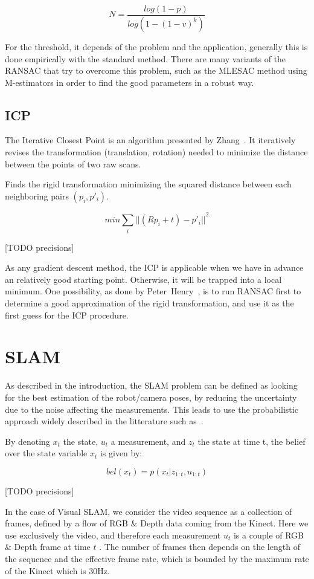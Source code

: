 \[
N = \frac{log(1-p)}{log(1-(1-v)^k)}
\]

For the threshold, it depends of the problem and the application, generally this is done empirically with the standard method. There are many variants of the RANSAC that try to overcome this problem, such as the MLESAC method \cite{TorrZ00} using M-estimators in order to find the good parameters in a robust way.


\subsection{ICP}

The Iterative Closest Point is an algorithm presented by Zhang~\cite{zhang_92_icp}.
It iteratively revises the transformation (translation, rotation) needed to minimize the distance between the points of two raw scans.

Finds the rigid transformation minimizing the squared distance between each neighboring pairs $(p_{i}, p'_{i})$.

\[min \sum_{i}{||(Rp_{i}+t)-p'_{i}||}^2\]

[TODO precisions]

As any gradient descent method, the ICP is applicable when we have in advance an relatively good starting point. Otherwise, it will be trapped into a local minimum. One possibility, as done by Peter~Henry~\cite{Intel_RGBD_2010}, is to run RANSAC first to determine a good approximation of the rigid transformation, and use it as the first guess for the ICP procedure.

\section{SLAM}

As described in the introduction, the SLAM problem can be defined as looking for the best estimation of the robot/camera poses, by reducing the uncertainty due to the noise affecting the measurements. This leads to use the probabilistic approach widely described in the litterature such as~\cite{Thrun_2005}.

By denoting $x_t$ the state, $u_t$ a measurement, and $z_t$ the state at time t, the belief over the state variable $x_t$ is given by:

\[bel(x_t) = p(x_t | z_{1:t}, u_{1:t})\]

[TODO precisions]

In the case of Visual SLAM, we consider the video sequence as a collection of frames, defined by a flow of RGB \& Depth data coming from the Kinect. Here we use exclusively the video, and therefore each measurement $u_t$ is a couple of RGB \& Depth frame at time $t$ . The number of frames then depends on the length of the sequence and the effective frame rate, which is bounded by the maximum rate of the Kinect which is 30Hz.


